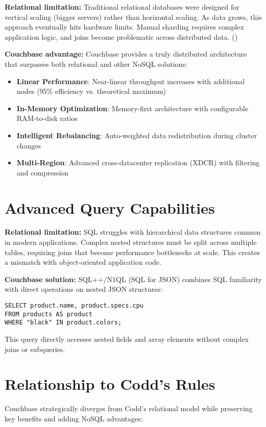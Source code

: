 \textbf{Relational limitation:} Traditional relational databases were designed for vertical scaling (bigger servers) rather than horizontal scaling. As data grows, this approach eventually hits hardware limits. Manual sharding requires complex application logic, and joins become problematic across distributed data. (\cite[p.44-50]{sadalage2012nosql})

\textbf{Couchbase advantage:} Couchbase provides a truly distributed architecture that surpasses both relational and other NoSQL solutions:
\begin{itemize}
  \item \textbf{Linear Performance}: Near-linear throughput increases with additional nodes (95\% efficiency vs. theoretical maximum)
  \item \textbf{In-Memory Optimization}: Memory-first architecture with configurable RAM-to-disk ratios
  \item \textbf{Intelligent Rebalancing}: Auto-weighted data redistribution during cluster changes
  \item \textbf{Multi-Region}: Advanced cross-datacenter replication (XDCR) with filtering and compression
\end{itemize}

\section{Advanced Query Capabilities}

\textbf{Relational limitation:} SQL struggles with hierarchical data structures common in modern applications. Complex nested structures must be split across multiple tables, requiring joins that become performance bottlenecks at scale. This creates a mismatch with object-oriented application code.

\textbf{Couchbase solution:} SQL++/N1QL (SQL for JSON) combines SQL familiarity with direct operations on nested JSON structures:

\begin{verbatim}
SELECT product.name, product.specs.cpu
FROM products AS product
WHERE "black" IN product.colors;
\end{verbatim}

This query directly accesses nested fields and array elements without complex joins or subqueries.

\section{Relationship to Codd's Rules}
Couchbase strategically diverges from Codd's relational model while preserving key benefits and adding NoSQL advantages:


